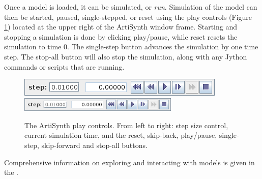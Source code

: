Once a model is loaded, it can be simulated, or {\it run}.  Simulation
of the model can then be started, paused, single-stepped, or reset
using the play controls (Figure \ref{PlayControlsFig}) located at the
upper right of the ArtiSynth window frame.  Starting and stopping a
simulation is done by clicking {\sf play/pause}, while {\sf reset}
resets the simulation to time 0.  The {\sf single-step} button
advances the simulation by one time step. The {\sf stop-all} button
will also stop the simulation, along with any Jython commands or
scripts that are running.

\begin{figure}[ht]
\begin{center}
\iflatexml
\includegraphics[]{../uiguide/images/playControls}
\else
\includegraphics[width=3in]{../uiguide/images/playControls}
\fi
\end{center}
\caption{The ArtiSynth play controls. From left to right: step size
control, current simulation time, and the reset, skip-back,
play/pause, single-step, skip-forward and stop-all buttons.}%
\label{PlayControlsFig}
\end{figure}

Comprehensive information on exploring and interacting with models is
given in the
.

\ifdefined\maindoc
\else

\fi
